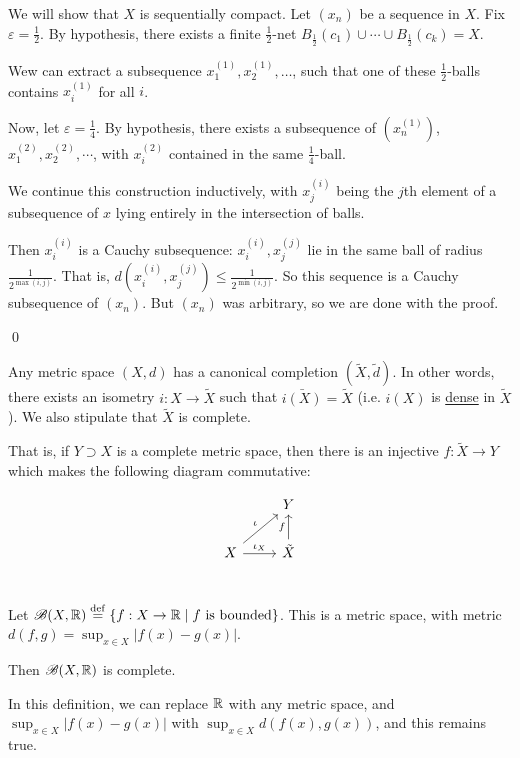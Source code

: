 \documentclass[x11names,reqno,14pt]{extarticle}
\begin{document}
\proof

We will show that $X$ is sequentially compact. Let $(x_n)$ be a sequence in $X$. Fix $\varepsilon=\frac{1}{2}$. By hypothesis, there exists a finite $\frac{1}{2}$-net $B_{\frac{1}{2}}(c_1) \cup \cdots \cup B_{\frac{1}{2}}(c_k) = X$. 

Wew can extract a subsequence $x^{(1)}_1, x^{(1)}_2, \dots$, such that one of these $\frac{1}{2}$-balls contains $x^{(1)}_i$ for all $i$.

Now, let $\varepsilon = \frac{1}{4}$. By hypothesis, there exists a subsequence of $(x^{(1)}_n)$, $x^{(2)}_1, x^{(2)}_2, \cdots$, with $x^{(2)}_i$ contained in the same $\frac{1}{4}$-ball. 

We continue this construction inductively, with $x^{(i)}_j$ being the $j$th element of a subsequence of $x$ lying entirely in the intersection of balls. 

Then $x^{(i)}_i$ is a Cauchy subsequence: $x^{(i)}_i, x^{(j)}_j$ lie in the same ball of radius $\frac{1}{2^{\max(i, j)}}$. That is, $d(x^{(i)}_i, x^{(j)}_j) \leq \frac{1}{2^{\min(i, j)}}$. So this sequence is a Cauchy subsequence of $(x_n)$. But $(x_n)$ was arbitrary, so we are done with the proof. 

\qed

\thm

Any metric space $(X, d)$ has a canonical completion $(\tilde{X}, \tilde{d})$. In other words, there exists an isometry $i:X\to\tilde{X}$ such that $\bar{i(X)} = \tilde{X}$ (i.e. $i(X)$ is \underline{dense} in $\tilde{X}$). We also stipulate that $\tilde{X}$ is complete. 

That is, if $Y \supset X$ is a complete metric space, then there is an injective $f:\tilde{X}\to Y$ which makes the following diagram commutative: 

\[
\begin{tikzcd}
& Y \\
X \ar[ur, "\iota"] \ar[r, "\iota_X"] & \ar[u, "f"] \tilde{X} \\
\end{tikzcd}
\]

\proof

\prop

Let $\mathscr{B}(X, \mathbb{R}) \overset{\mathrm{def}}{=} \{f:X\to\mathbb{R} \mid f\text{ is bounded}\}$. This is a metric space, with metric $d(f, g) = \sup_{x\in X}|f(x) - g(x)|$. 

Then $\mathscr{B}(X, \mathbb{R})$ is complete. 

\rem 

In this definition, we can replace $\mathbb{R}$ with any metric space, and $\sup_{x\in X}|f(x) - g(x)|$ with $\sup_{x\in X}d(f(x), g(x))$, and this remains true.
\end{document}
